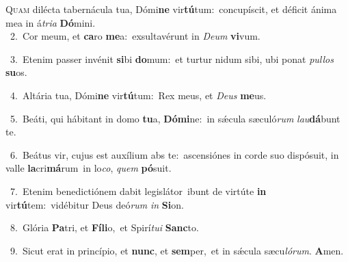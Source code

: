 \lettrine{\initial\textcolor{\initialcolor}{Q}}{uam} dilécta tabernácula tua, Dómi\textbf{ne} vir\-\textbf{tú}\-tum:~\star concupíscit, et déficit ánima mea in á\-\textit{tri}\-\textit{a} \textbf{Dó}\-mini.\\
{\numbfont\textcolor{\numbcolor}{~2.}}~Cor meum, et \textbf{ca}\-ro \textbf{me}\-a:~\star exsultavérunt in \textit{De}\-\textit{um} \textbf{vi}\-vum.\par
{\numbfont\textcolor{\numbcolor}{~3.}}~Etenim passer invénit \textbf{si}\-bi \textbf{do}\-mum:~\star et turtur nidum sibi, ubi ponat \textit{pul}\-\textit{los} \textbf{su}\-os.\par
{\numbfont\textcolor{\numbcolor}{~4.}}~Altária tua, Dómi\textbf{ne} vir\-\textbf{tú}\-tum:~\star Rex meus, et \textit{De}\-\textit{us} \textbf{me}\-us.\par
{\numbfont\textcolor{\numbcolor}{~5.}}~Beáti, qui hábitant in domo \textbf{tu}\-a, \textbf{Dó}\-\textbf{mi}ne:~\star in sǽcula sæculó\textit{rum} \textit{lau}\-\textbf{dá}bunt te.\par
{\numbfont\textcolor{\numbcolor}{~6.}}~Beátus vir, cujus est auxílium abs te:~\dagger ascensiónes in corde suo dispósuit, in valle \textbf{la}\-cri\-\textbf{má}\-rum~\star in lo\-\textit{co}\-, \textit{quem} \textbf{pó}\-suit.\par
{\numbfont\textcolor{\numbcolor}{~7.}}~Etenim benedictiónem dabit legislátor~\dagger ibunt de virtúte \textbf{in} vir\-\textbf{tú}\-tem:~\star vidébitur Deus deó\textit{rum} \textit{in} \textbf{Si}\-on.\par
{\numbfont\textcolor{\numbcolor}{~8.}}~Glória \textbf{Pa}\-tri, et \textbf{Fí}\-\textbf{li}o,~\star et Spirí\-\textit{tu}\-\textit{i} \textbf{Sanc}\-to.\par
{\numbfont\textcolor{\numbcolor}{~9.}}~Sicut erat in princípio, et \textbf{nunc}\-, et \textbf{sem}\-per,~\star et in sǽcula sæcu\-\textit{ló}\-\textit{rum}. \textbf{A}\-men.\par
